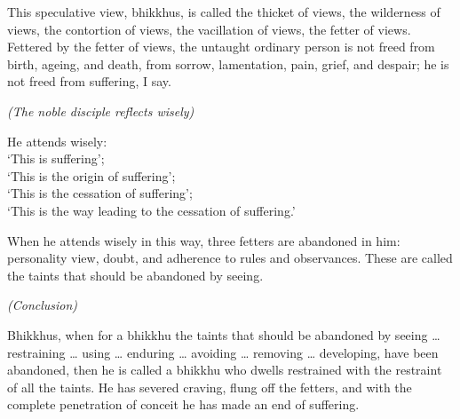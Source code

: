 {This speculative view, bhikkhus, is called the thicket of views, the
wilderness of views, the contortion of views, the vacillation of views,
the fetter of views. Fettered by the fetter of views, the untaught
ordinary person is not freed from birth, ageing, and death, from sorrow,
lamentation, pain, grief, and despair; he is not freed from suffering, I
say.

\emph{(The noble disciple reflects wisely)}

He attends wisely:\\
`This is suffering';\\
`This is the origin of suffering';\\
`This is the cessation of suffering';\\
`This is the way leading to the cessation of suffering.'

When he attends wisely in this way, three fetters are abandoned in him:
personality view, doubt, and adherence to rules and observances. These
are called the taints that should be abandoned by seeing.

\enlargethispage*{\baselineskip}

\emph{(Conclusion)}

Bhikkhus, when for a bhikkhu the taints that should be abandoned by seeing
\ldots{} restraining \ldots{} using \ldots{} enduring \ldots{} avoiding \ldots{}
removing \ldots{} developing, have been abandoned, then he is called a bhikkhu who dwells
restrained with the restraint of all the taints. He has severed craving, flung
off the fetters, and with the complete penetration of conceit he has made an end
of suffering.

}
